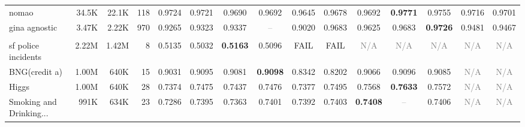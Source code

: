 \begin{table}[t]
{\begin{tabular}{lrrrccccccccccc}
nomao & 34.5K & 22.1K & 118 & \cellcolor[HTML]{F5F0CE}0.9724 & \cellcolor[HTML]{F7F0CD}0.9721 & \cellcolor[HTML]{FCE7CC}0.9690 & \cellcolor[HTML]{FCE8CC}0.9692 & \cellcolor[HTML]{F4CCCC}0.9645 & \cellcolor[HTML]{FAE0CC}0.9678 & \cellcolor[HTML]{FCE8CC}0.9692 & \cellcolor[HTML]{D9EAD3}\textbf{0.9771} & \cellcolor[HTML]{E3ECD1}0.9755 & \cellcolor[HTML]{FAF1CD}0.9716 & \cellcolor[HTML]{FEEECC}0.9701 \\
gina agnostic & 3.47K & 2.22K & 970 & \cellcolor[HTML]{FCE6CC}0.9265 & \cellcolor[HTML]{FDEDCC}0.9323 & \cellcolor[HTML]{FEEECC}0.9337 & \textcolor{gray}{--} & \cellcolor[HTML]{F4CCCC}0.9020 & \cellcolor[HTML]{DEEBD2}0.9683 & \cellcolor[HTML]{E4ECD1}0.9625 & \cellcolor[HTML]{DEEBD2}0.9683 & \cellcolor[HTML]{D9EAD3}\textbf{0.9726} & \cellcolor[HTML]{F3F0CE}0.9481 & \cellcolor[HTML]{F5F0CE}0.9467 \\
\addlinespace[2pt]
\rowcolor{gray!15}
\multicolumn{15}{l}{\textbf{Balanced Accuracy}} \\
sf police incidents & 2.22M & 1.42M & 8 & \cellcolor[HTML]{E9EDD0}0.5135 & \cellcolor[HTML]{F4CCCC}0.5032 & \cellcolor[HTML]{D9EAD3}\textbf{0.5163} & \cellcolor[HTML]{FFF1CC}0.5096 & \textcolor{red!70!black}{FAIL} & \textcolor{red!70!black}{FAIL} & \textcolor{gray}{N/A} & \textcolor{gray}{N/A} & \textcolor{gray}{N/A} & \textcolor{gray}{N/A} & \textcolor{gray}{N/A} \\
BNG(credit a) & 1.00M & 640K & 15 & \cellcolor[HTML]{DFEBD2}0.9031 & \cellcolor[HTML]{D9EAD3}0.9095 & \cellcolor[HTML]{DAEAD3}0.9081 & \cellcolor[HTML]{D9EAD3}\textbf{0.9098} & \cellcolor[HTML]{F7D8CC}0.8342 & \cellcolor[HTML]{F4CCCC}0.8202 & \cellcolor[HTML]{DCEBD2}0.9066 & \cellcolor[HTML]{D9EAD3}0.9096 & \cellcolor[HTML]{DAEAD3}0.9085 & \textcolor{gray}{N/A} & \textcolor{gray}{N/A} \\
Higgs & 1.00M & 640K & 28 & \cellcolor[HTML]{F4CCCC}0.7374 & \cellcolor[HTML]{FDEACC}0.7475 & \cellcolor[HTML]{F9DECC}0.7437 & \cellcolor[HTML]{FDEACC}0.7476 & \cellcolor[HTML]{F4CDCC}0.7377 & \cellcolor[HTML]{FEF0CC}0.7495 & \cellcolor[HTML]{ECEECF}0.7568 & \cellcolor[HTML]{D9EAD3}\textbf{0.7633} & \cellcolor[HTML]{EBEED0}0.7572 & \textcolor{gray}{N/A} & \textcolor{gray}{N/A} \\
Smoking and Drinking... & 991K & 634K & 23 & \cellcolor[HTML]{F4CCCC}0.7286 & \cellcolor[HTML]{E1ECD2}0.7395 & \cellcolor[HTML]{F5F0CE}0.7363 & \cellcolor[HTML]{DDEBD2}0.7401 & \cellcolor[HTML]{E3ECD1}0.7392 & \cellcolor[HTML]{DCEBD2}0.7403 & \cellcolor[HTML]{D9EAD3}\textbf{0.7408} & \textcolor{gray}{--} & \cellcolor[HTML]{DAEAD3}0.7406 & \textcolor{gray}{N/A} & \textcolor{gray}{N/A} \\

\end{tabular}}
\end{table}
